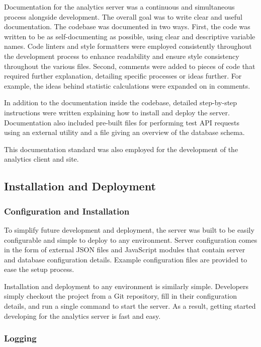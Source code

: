 Documentation for the analytics server was a continuous and simultaneous process alongside development. The overall goal was to write clear and useful documentation. The codebase was documented in two ways. First, the code was written to be as self-documenting as possible, using clear and descriptive variable names. Code linters and style formatters were employed consistently throughout the development process to enhance readability and ensure style consistency throughout the various files. Second, comments were added to pieces of code that required further explanation, detailing specific processes or ideas further. For example, the ideas behind statistic calculations were expanded on in comments.

In addition to the documentation inside the codebase, detailed step-by-step instructions were written explaining how to install and deploy the server. Documentation also included pre-built files for performing test API requests using an external utility and a file giving an overview of the database schema.

This documentation standard was also employed for the development of the analytics client and site.

\subsection{Installation and Deployment}

\subsubsection{Configuration and Installation}

To simplify future development and deployment, the server was built to be easily configurable and simple to deploy to any environment. Server configuration comes in the form of external JSON files and JavaScript modules that contain server and database configuration details. Example configuration files are provided to ease the setup process. 

Installation and deployment to any environment is similarly simple. Developers simply checkout the project from a Git repository, fill in their configuration details, and run a single command to start the server. As a result, getting started developing for the analytics server is fast and easy. 

\subsubsection{Logging}

